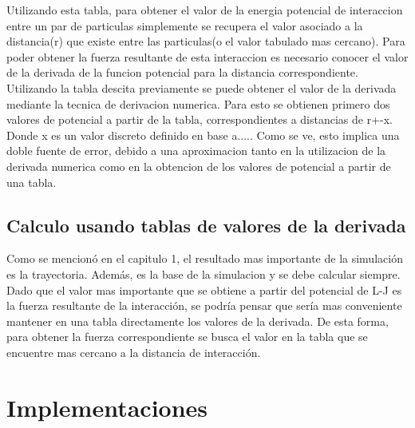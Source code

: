 \documentclass[a4paper,10pt]{report}
\begin{document}



Utilizando esta tabla, para obtener el valor de la energia potencial de interaccion entre un par de particulas simplemente se recupera el valor asociado a la distancia(r) que existe entre las particulas(o el valor tabulado mas cercano).
Para poder obtener la fuerza resultante de esta interaccion es necesario conocer el valor de la derivada de la funcion potencial para la distancia correspondiente.
Utilizando la tabla descita previamente se puede obtener el valor de la derivada mediante la tecnica de derivacion numerica. 
Para esto se obtienen primero dos valores de potencial a partir de la tabla, correspondientes a distancias de r+-x. Donde x es un valor discreto definido en base a.....
Como se ve, esto implica una doble fuente de error, debido a una aproximacion tanto en la utilizacion de la derivada numerica como en la obtencion de los valores de potencial a partir de una tabla.





\section{Calculo usando tablas de valores de la derivada  }

Como se mencionó en el capitulo 1, el resultado mas importante de la simulación es la trayectoria. Además, es la base de la simulacion y se debe calcular siempre.
Dado que el valor mas importante que se obtiene a partir del potencial de L-J es la fuerza resultante de la interacción, se podría pensar que sería mas conveniente mantener en una tabla directamente los valores de la derivada. 
De esta forma, para obtener la fuerza correspondiente se busca el valor en la tabla que se encuentre mas cercano a la distancia de interacción. 
















\chapter{Implementaciones}

\end{document}

